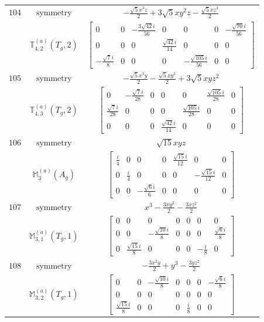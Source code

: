 \documentclass[fleqn,8pt,landscape]{jsarticle}
\begin{document}
\begin{longtable}{ccc}
$ 104 $ & $ \text{symmetry} $ & $ - \frac{\sqrt{5} x^{3} z}{2} + 3 \sqrt{5} x y^{2} z - \frac{\sqrt{5} x z^{3}}{2} $ \\
$  $ & $ \mathbb{T}_{4,2}^{(a)}(T_{g},2) $ & $ \begin{bmatrix} 0 & 0 & - \frac{3 \sqrt{42} i}{56} & 0 & 0 & 0 & - \frac{\sqrt{70} i}{56} \\ 0 & 0 & 0 & \frac{\sqrt{42} i}{14} & 0 & 0 & 0 \\ - \frac{\sqrt{7} i}{8} & 0 & 0 & 0 & - \frac{\sqrt{105} i}{56} & 0 & 0 \end{bmatrix} $ \\ \hline
$ 105 $ & $ \text{symmetry} $ & $ - \frac{\sqrt{5} x^{3} y}{2} - \frac{\sqrt{5} x y^{3}}{2} + 3 \sqrt{5} x y z^{2} $ \\
$  $ & $ \mathbb{T}_{4,3}^{(a)}(T_{g},2) $ & $ \begin{bmatrix} 0 & - \frac{\sqrt{7} i}{28} & 0 & 0 & 0 & \frac{\sqrt{105} i}{28} & 0 \\ \frac{\sqrt{7} i}{28} & 0 & 0 & 0 & \frac{\sqrt{105} i}{28} & 0 & 0 \\ 0 & 0 & 0 & \frac{\sqrt{42} i}{14} & 0 & 0 & 0 \end{bmatrix} $ \\ \hline
$ 106 $ & $ \text{symmetry} $ & $ \sqrt{15} x y z $ \\
$  $ & $ \mathbb{M}_{3}^{(a)}(A_{g}) $ & $ \begin{bmatrix} \frac{i}{4} & 0 & 0 & 0 & \frac{\sqrt{15} i}{12} & 0 & 0 \\ 0 & \frac{i}{4} & 0 & 0 & 0 & - \frac{\sqrt{15} i}{12} & 0 \\ 0 & 0 & - \frac{\sqrt{6} i}{6} & 0 & 0 & 0 & 0 \end{bmatrix} $ \\ \hline
$ 107 $ & $ \text{symmetry} $ & $ x^{3} - \frac{3 x y^{2}}{2} - \frac{3 x z^{2}}{2} $ \\
$  $ & $ \mathbb{M}_{3,1}^{(a)}(T_{g},1) $ & $ \begin{bmatrix} 0 & 0 & 0 & 0 & 0 & 0 & 0 \\ 0 & 0 & - \frac{\sqrt{10} i}{8} & 0 & 0 & 0 & \frac{\sqrt{6} i}{8} \\ 0 & \frac{\sqrt{15} i}{8} & 0 & 0 & 0 & - \frac{i}{8} & 0 \end{bmatrix} $ \\ \hline
$ 108 $ & $ \text{symmetry} $ & $ - \frac{3 x^{2} y}{2} + y^{3} - \frac{3 y z^{2}}{2} $ \\
$  $ & $ \mathbb{M}_{3,2}^{(a)}(T_{g},1) $ & $ \begin{bmatrix} 0 & 0 & - \frac{\sqrt{10} i}{8} & 0 & 0 & 0 & - \frac{\sqrt{6} i}{8} \\ 0 & 0 & 0 & 0 & 0 & 0 & 0 \\ \frac{\sqrt{15} i}{8} & 0 & 0 & 0 & \frac{i}{8} & 0 & 0 \end{bmatrix} $ \\ \hline

\end{longtable}
\end{document}
